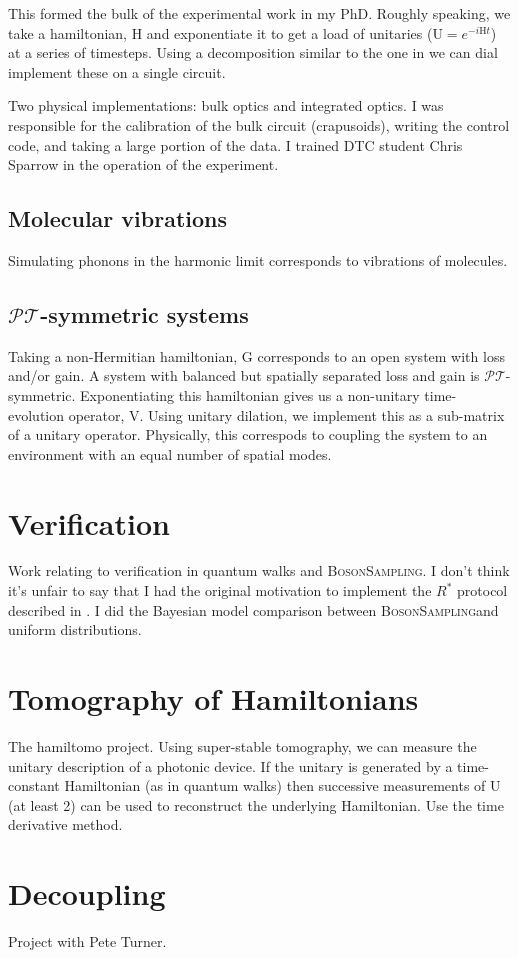 \documentclass[11pt,a4paper,twoside]{report}
\newcommand{\bosonsampling}{\textsc{BosonSampling}}
\newcommand{\rstar}{R^{*}}
\newcommand{\pt}{\(\mathcal{PT}\)}
\newcommand{\mat}[1]{\mathrm{#1}}
\begin{document}
This formed the bulk of the experimental work in my PhD. Roughly speaking, we
take a hamiltonian, \(\mat{H}\) and exponentiate it to get a load of unitaries
(\(\mat{U}=e^{-i\mat{H}t}\)) at a series of timesteps. Using a decomposition
similar to the one in \cite{reck94} we can dial implement these on a single
circuit.

Two physical implementations: bulk optics and integrated optics. I was
responsible for the calibration of the bulk circuit (crapusoids), writing the
control code, and taking a large portion of the data. I trained DTC student
Chris Sparrow in the operation of the experiment.

\section{Molecular vibrations}
Simulating phonons in the harmonic limit corresponds to vibrations of molecules.

\section{\pt-symmetric systems}
Taking a non-Hermitian hamiltonian, \(\mat{G}\) corresponds to an open system
with loss and/or gain. A system with balanced but spatially separated loss and
gain is \pt-symmetric. Exponentiating this hamiltonian gives us a non-unitary
time-evolution operator, \(\mat{V}\). Using unitary dilation, we implement this
as a sub-matrix of a unitary operator. Physically, this correspods to coupling
the system to an environment with an equal number of spatial modes.

\chapter{Verification}

Work relating to verification in quantum walks and \bosonsampling. I don't think
it's unfair to say that I had the original motivation to implement the
\(\rstar\) protocol described in \cite{aaronson13}. I did the Bayesian model
comparison between \bosonsampling and uniform distributions.

\chapter{Tomography of Hamiltonians}
The hamiltomo project. Using super-stable tomography, we can measure the unitary
description of a photonic device. If the unitary is generated by a time-constant
Hamiltonian (as in quantum walks) then successive measurements of \(\mat{U}\)
(at least 2) can be used to reconstruct the underlying Hamiltonian. Use the time
derivative method.

\chapter{Decoupling}

Project with Pete Turner.



\end{document}
